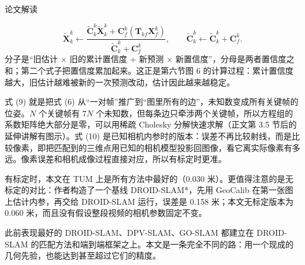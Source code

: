 \begin{interp}{论文解读}

\[ \tilde{\mathbf{X}}^k_k\leftarrow\frac{\tilde{\mathbf{C}}^k_k\tilde{\mathbf{X}}^k_k+\mathbf{C}^k_f(\mathbf{T}_{kf}\mathbf{X}^k_f)}{\tilde{\mathbf{C}}^k_k+\mathbf{C}^k_f},\qquad \tilde{\mathbf{C}}^k_k\leftarrow\tilde{\mathbf{C}}^k_k+\mathbf{C}^k_f. \]
分子是“旧估计 $\times$ 旧的累计置信度 + 新预测 $\times$ 新置信度”，分母是两者置信度之和；第二个式子把置信度累加起来。这正是第六节图 6 的计算过程：累计置信度越大，旧估计越难被新的一次预测改动，估计因此越来越稳定。


式 (9) 就是把式 (6) 从“一对帧”推广到“图里所有的边”，未知数变成所有关键帧的位姿。$N$ 个关键帧有 $7N$ 个未知数，但每条边只牵涉两个关键帧，所以方程组的系数矩阵绝大部分是零，可以用稀疏 Cholesky 分解快速求解（正文第 3.5 节后的延伸讲解有图示）。式 (10) 是已知相机内参时的版本：误差不再比较射线，而是比较像素，即把匹配到的三维点用已知的相机模型投影回图像，看它离实际像素有多远。像素误差和相机成像过程直接对应，所以有标定时更准。



\begin{center}
\end{center}

有标定时，本文在 TUM 上是所有方法中最好的（0.030 米）。更值得注意的是无标定的对比：作者构造了一个基线 DROID-SLAM*，先用 GeoCalib 在第一张图上估计内参，再交给 DROID-SLAM 运行，误差是 0.158 米；本文无标定版本为 0.060 米，而且没有假设整段视频的相机参数固定不变。

此前表现最好的 DROID-SLAM、DPV-SLAM、GO-SLAM 都建立在 DROID-SLAM 的匹配方法和端到端框架之上。本文是一条完全不同的路：用一个现成的几何先验，也能达到甚至超过它们的精度。


\end{interp}
